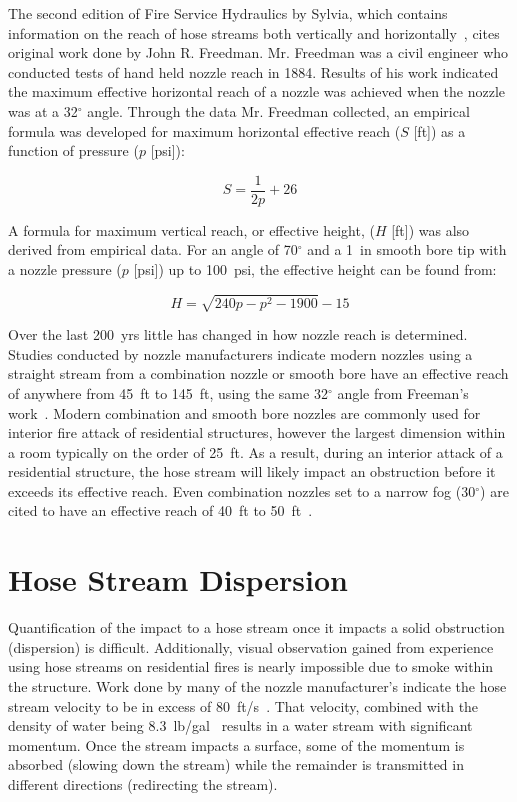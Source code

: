 \documentclass[12pt,oneside]{book}
\begin{document}
The second edition of Fire Service Hydraulics by Sylvia, which contains information on the reach of hose streams both vertically and horizontally~\cite{SYLVIA:1970}, cites original work done by John R. Freedman. Mr. Freedman was a civil engineer who conducted tests of hand held nozzle reach in 1884. Results of his work indicated the maximum effective horizontal reach of a nozzle was achieved when the nozzle was at a 32$^\circ$ angle. Through the data Mr. Freedman collected, an empirical formula was developed for maximum horizontal effective reach ($S$ [ft]) as a function of pressure ($p$ [psi]): 

\begin{equation*}
	S = \frac{1}{2p}+26
\end{equation*}

A formula for maximum vertical reach, or effective height, ($H$ [ft]) was also derived from empirical data. For an angle of 70$^{\circ}$ and a 1~in smooth bore tip with a nozzle pressure ($p$ [psi]) up to 100~psi, the effective height can be found from:

\begin{equation*}
	H = \sqrt{240p - p^2 - 1900} -15
\end{equation*}

Over the last 200~yrs little has changed in how nozzle reach is determined. Studies conducted by nozzle manufacturers indicate modern nozzles using a straight stream from a combination nozzle or smooth bore have an effective reach of anywhere from 45~ft to 145~ft, using the same 32$^\circ$ angle from Freeman's work~\cite{TFT_Reach,Elkhart_Reach,Akron_Reach}. Modern combination and smooth bore nozzles are commonly used for interior fire attack of residential structures, however the largest dimension within a room typically on the order of 25~ft. As a result, during an interior attack of a residential structure, the hose stream will likely impact an obstruction before it exceeds its effective reach. Even combination nozzles set to a narrow fog (30$^\circ$) are cited to have an effective reach of 40~ft to 50~ft~\cite{Elkhart_Reach}.

\section{Hose Stream Dispersion}
\label{sec:dispersion}
Quantification of the impact to a hose stream once it impacts a solid obstruction (dispersion) is difficult. Additionally, visual observation gained from experience using hose streams on residential fires is nearly impossible due to smoke within the structure. Work done by many of the nozzle manufacturer's indicate the hose stream velocity to be in excess of 80~ft/s~\cite{NBFU:EffectiveReach}. That velocity, combined with the density of water being 8.3~lb/gal~\cite{SFPEHandbookPurser} results in a water stream with significant momentum. Once the stream impacts a surface, some of the momentum is absorbed (slowing down the stream) while the remainder is transmitted in different directions (redirecting the stream). 
\end{document}
